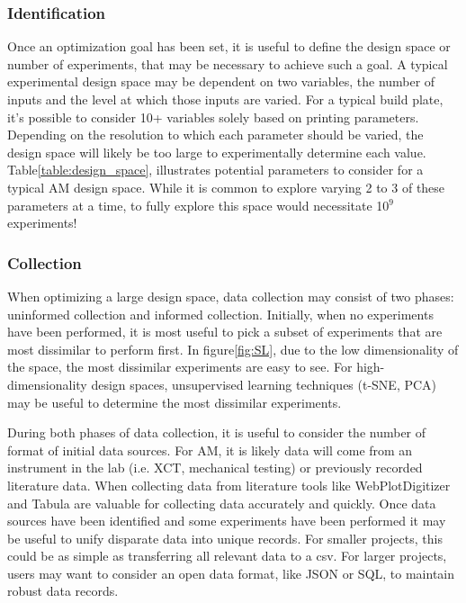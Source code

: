 \subsubsection{Identification}
Once an optimization goal has been set, it is useful to define the design space or number of experiments, that may be necessary to achieve such a goal.
A typical experimental design space may be dependent on two variables, the number of inputs and the level at which those inputs are varied.
For a typical build plate, it's possible to consider 10+ variables solely based on printing parameters.
Depending on the resolution to which each parameter should be varied, the design space will likely be too large to experimentally determine each value.
Table\ref{table:design_space}, illustrates potential parameters to consider for a typical AM design space.
While it is common to explore varying 2 to 3 of these parameters at a time, to fully explore this space would necessitate 10$^9$ experiments!

\subsubsection{Collection}
When optimizing a large design space, data collection may consist of two phases: uninformed collection and informed collection.
Initially, when no experiments have been performed, it is most useful to pick a subset of experiments that are most dissimilar to perform first.
In figure\ref{fig:SL}, due to the low dimensionality of the space, the most dissimilar experiments are easy to see.
For high-dimensionality design spaces, unsupervised learning techniques (t-SNE, PCA) may be useful to determine the most dissimilar experiments.

During both phases of data collection, it is useful to consider the number of format of initial data sources.
For AM, it is likely data will come from an instrument in the lab (i.e. XCT, mechanical testing) or previously recorded literature data.
When collecting data from literature tools like WebPlotDigitizer and Tabula are valuable for collecting data accurately and quickly.
Once data sources have been identified and some experiments have been performed it may be useful to unify disparate data into unique records.
For smaller projects, this could be as simple as transferring all relevant data to a csv.
For larger projects, users may want to consider an open data format, like JSON or SQL, to maintain robust data records.

